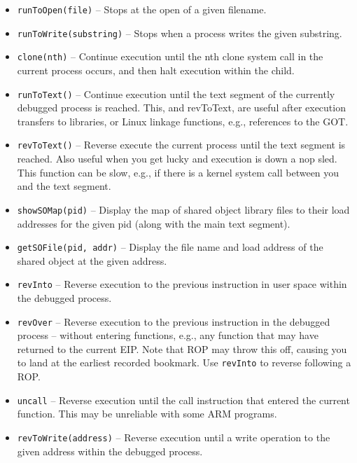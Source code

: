 \documentclass[titlepage]{article}
\begin{document}
\begin{itemize}
\item {\tt runToOpen(file)} -- Stops at the open of a given filename.

\item {\tt runToWrite(substring)} -- Stops when a process writes the given substring.

\item {\tt clone(nth)} – Continue execution until the nth clone system call in the current process occurs, and then halt execution within the child.

\item {\tt runToText()} – Continue execution until the text segment of the currently debugged process is reached.  This, and revToText, are useful after execution transfers to libraries, or Linux linkage functions, e.g., references to the GOT.

\item {\tt revToText()} – Reverse execute the current process until the text segment is reached.  Also useful when you get lucky and execution is down a nop sled.  This function can be slow, e.g., if there is a kernel system call between you and the text segment.
 
\item {\tt showSOMap(pid)} – Display the map of shared object library files to their load addresses for the given pid (along with the main text segment).

\item {\tt getSOFile(pid, addr)} – Display the file name and load address of the shared object at the given address.

\item {\tt revInto} – Reverse execution to the previous instruction in user space within the debugged process. 

\item {\tt revOver} – Reverse execution to the previous instruction in the debugged process – without entering functions, e.g., any function that may have returned to the current EIP.  Note that ROP may throw this off, causing you to land at the earliest recorded bookmark.  Use {\tt revInto} to reverse following a ROP.

\item {\tt uncall} – Reverse execution until the call instruction that entered the current function.  This may be unreliable with some ARM
programs.

\item {\tt revToWrite(address)} – Reverse execution until a write operation to the given address within the debugged process.


\end{itemize}
\end{document}
